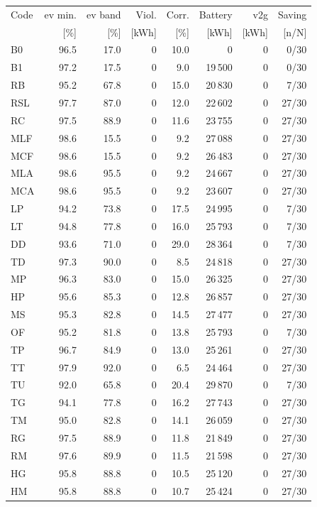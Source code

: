 \noindent\begin{minipage}{\textwidth}\singlespacing\captionsetup{font=footnotesize}
\setlength{\tabcolsep}{4pt}
\renewcommand{\arraystretch}{1.0}
\label{tab:full-scorecard-3-1}
\fontsize{8}{9}\selectfont
\begin{tabular*}{\textwidth}{@{\extracolsep{\fill}}lrrrrrrr@{}}
\toprule
Code & \gls{ev} min. & \gls{ev} band & Viol. & Corr. & Battery & \gls{v2g} & Saving\\
 & [\%] & [\%] & [kWh] & [\%] & [kWh] & [kWh] & [n/N]\\
\midrule
B0 & 96.5 & 17.0 & 0 & 10.0 & 0 & 0 & 0/30\\
B1 & 97.2 & 17.5 & 0 & 9.0 & 19\,500 & 0 & 0/30\\
RB & 95.2 & 67.8 & 0 & 15.0 & 20\,830 & 0 & 7/30\\
RSL & 97.7 & 87.0 & 0 & 12.0 & 22\,602 & 0 & 27/30\\
RC & 97.5 & 88.9 & 0 & 11.6 & 23\,755 & 0 & 27/30\\
MLF & 98.6 & 15.5 & 0 & 9.2 & 27\,088 & 0 & 27/30\\
MCF & 98.6 & 15.5 & 0 & 9.2 & 26\,483 & 0 & 27/30\\
MLA & 98.6 & 95.5 & 0 & 9.2 & 24\,667 & 0 & 27/30\\
MCA & 98.6 & 95.5 & 0 & 9.2 & 23\,607 & 0 & 27/30\\
LP & 94.2 & 73.8 & 0 & 17.5 & 24\,995 & 0 & 7/30\\
LT & 94.8 & 77.8 & 0 & 16.0 & 25\,793 & 0 & 7/30\\
DD & 93.6 & 71.0 & 0 & 29.0 & 28\,364 & 0 & 7/30\\
TD & 97.3 & 90.0 & 0 & 8.5 & 24\,818 & 0 & 27/30\\
MP & 96.3 & 83.0 & 0 & 15.0 & 26\,325 & 0 & 27/30\\
HP & 95.6 & 85.3 & 0 & 12.8 & 26\,857 & 0 & 27/30\\
MS & 95.3 & 82.8 & 0 & 14.5 & 27\,477 & 0 & 27/30\\
OF & 95.2 & 81.8 & 0 & 13.8 & 25\,793 & 0 & 7/30\\
TP & 96.7 & 84.9 & 0 & 13.0 & 25\,261 & 0 & 27/30\\
TT & 97.9 & 92.0 & 0 & 6.5 & 24\,464 & 0 & 27/30\\
TU & 92.0 & 65.8 & 0 & 20.4 & 29\,870 & 0 & 7/30\\
TG & 94.1 & 77.8 & 0 & 16.2 & 27\,743 & 0 & 27/30\\
TM & 95.0 & 82.8 & 0 & 14.1 & 26\,059 & 0 & 27/30\\
RG & 97.5 & 88.9 & 0 & 11.8 & 21\,849 & 0 & 27/30\\
RM & 97.6 & 89.9 & 0 & 11.5 & 21\,598 & 0 & 27/30\\
HG & 95.8 & 88.8 & 0 & 10.5 & 25\,120 & 0 & 27/30\\
HM & 95.8 & 88.8 & 0 & 10.7 & 25\,424 & 0 & 27/30\\
\bottomrule\end{tabular*}
\end{minipage}\par\medskip
